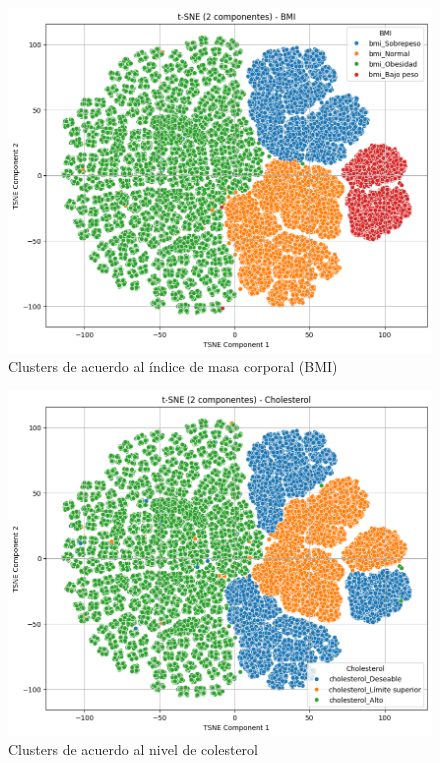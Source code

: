 \documentclass[10pt,journal,compsoc]{IEEEtran}
\begin{document}
\begin{figure}[htb]
    \centering
    \includegraphics[width=\linewidth]{imagenes/bmi.png}
    \caption{Clusters de acuerdo al índice de masa corporal (BMI)}
    \label{fig:tsne_bmi}
\end{figure}

\begin{figure}[htb]
    \centering
    \includegraphics[width=\linewidth]{imagenes/cholesterol.png}
    \caption{Clusters de acuerdo al nivel de colesterol}
    \label{fig:tsne_cholesterol}
\end{figure}
\end{document}
